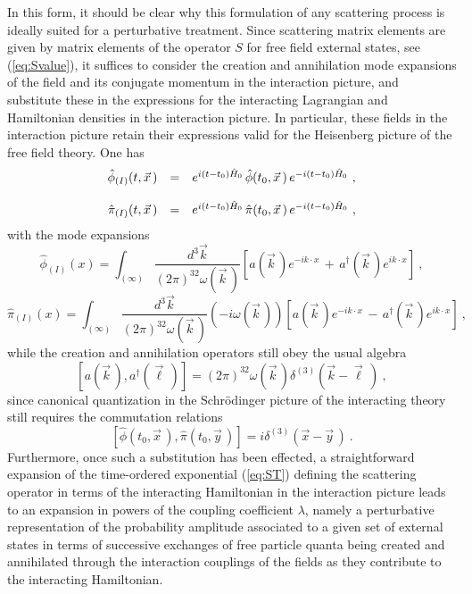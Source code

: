 \documentclass[a4paper,11pt]{article}
\begin{document}
\vspace{5pt}

In this form, it should be clear why this formulation of any scattering
process is ideally suited for a perturbative treatment. Since scattering
matrix elements are given by matrix elements of the operator $S$ for
free field external states, see (\ref{eq:Svalue}), it suffices to consider 
the creation and annihilation mode expansions of the field and its conjugate 
momentum in the interaction picture, and substitute these in the expressions 
for the interacting Lagrangian and Hamiltonian densities in the interaction 
picture. In particular, these fields in the interaction picture retain their 
expressions valid for the Heisenberg picture of the free field theory. One has
\begin{equation}
\begin{array}{r c l}
\hat{\phi}_{(I)}(t,\vec{x}\,)&=&e^{i(t-t_0)\hat{H}_0}\,
\hat{\phi}(t_0,\vec{x}\,)\,e^{-i(t-t_0)\hat{H}_0}\ ,\\
 & & \\
\hat{\pi}_{(I)}(t,\vec{x}\,)&=&e^{i(t-t_0)\hat{H}_0}\,
\hat{\pi}(t_0,\vec{x}\,)\,e^{-i(t-t_0)\hat{H}_0}\ ,
\end{array}
\end{equation}
with the mode expansions
\begin{equation}
\hat{\phi}_{(I)}(x)=\int_{(\infty)}\frac{d^3\vec{k}}
{(2\pi)^32\omega(\vec{k}\,)}\left[a(\vec{k}\,)e^{-ik\cdot x}\,+\,
a^\dagger(\vec{k}\,)e^{ik\cdot x}\right]\ ,
\end{equation}
\begin{equation}
\hat{\pi}_{(I)}(x)=\int_{(\infty)}\frac{d^3\vec{k}}
{(2\pi)^32\omega(\vec{k}\,)}\left(-i\omega(\vec{k}\,)\right)
\left[a(\vec{k}\,)e^{-ik\cdot x}\,-\,
a^\dagger(\vec{k}\,)e^{ik\cdot x}\right]\ ,
\end{equation}
while the creation and annihilation operators still obey the usual
algebra
\begin{equation}
\left[a(\vec{k}\,),a^\dagger(\vec{\ell}\,)\right]=(2\pi)^32\omega(\vec{k}\,)
\delta^{(3)}\left(\vec{k}-\vec{\ell}\,\right)\ ,
\end{equation}
since canonical quantization in the Schr\"odinger picture of the interacting
theory still requires the commutation relations
\begin{equation}
\left[\hat{\phi}(t_0,\vec{x}\,),\hat{\pi}(t_0,\vec{y}\,)\right]=
i\delta^{(3)}\left(\vec{x}-\vec{y}\,\right)\ .
\end{equation}
Furthermore, once such a substitution has been effected, a straightforward
expansion of the time-ordered exponential (\ref{eq:ST}) defining the 
scattering ope\-ra\-tor in terms of the interacting Hamiltonian in the 
interaction picture leads to an expansion in powers of the coupling 
coefficient $\lambda$, namely a perturbative representation of the 
probability amplitude associated to a given set of external states in terms 
of successive exchanges of free particle quanta being created and 
annihilated through the interaction couplings of the fields as they contribute 
to the interacting Hamiltonian.
\end{document}
